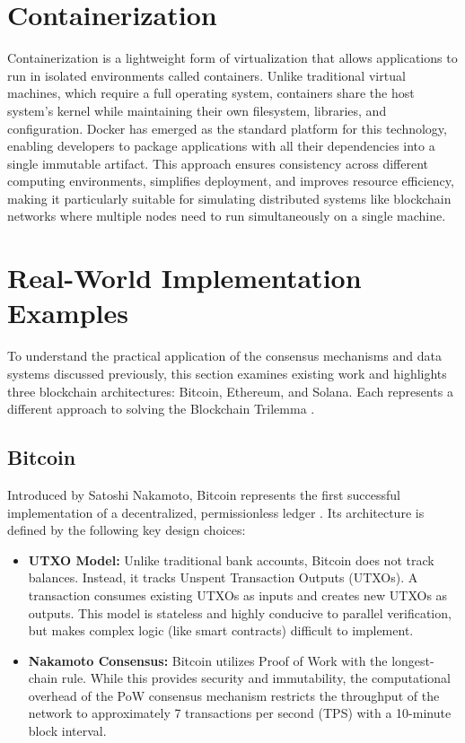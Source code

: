 \section{Containerization} \label{ch2_containerization}

Containerization is a lightweight form of virtualization that allows applications to run in isolated environments called containers. Unlike traditional virtual machines, which require a full operating system, containers share the host system's kernel while maintaining their own filesystem, libraries, and configuration. Docker \cite{docker} has emerged as the standard platform for this technology, enabling developers to package applications with all their dependencies into a single immutable artifact. This approach ensures consistency across different computing environments, simplifies deployment, and improves resource efficiency, making it particularly suitable for simulating distributed systems like blockchain networks where multiple nodes need to run simultaneously on a single machine.


\section{Real-World Implementation Examples} \label{ch2_relatedWork}

To understand the practical application of the consensus mechanisms and data systems discussed previously, this section examines existing work and highlights three blockchain architectures: Bitcoin, Ethereum, and Solana. Each represents a different approach to solving the Blockchain Trilemma \cite{blockchainTrilemma}.

\subsection{Bitcoin}\label{ch2_relatedWork_bitcoin}
Introduced by Satoshi Nakamoto, Bitcoin represents the first successful implementation of a decentralized, permissionless ledger \cite{garay2015bitcoin}. Its architecture is defined by the following key design choices:

\begin{itemize}
    \item \textbf{UTXO Model:} Unlike traditional bank accounts, Bitcoin does not track balances. Instead, it tracks Unspent Transaction Outputs (UTXOs). A transaction consumes existing UTXOs as inputs and creates new UTXOs as outputs. This model is stateless and highly conducive to parallel verification, but makes complex logic (like smart contracts) difficult to implement.
    \item \textbf{Nakamoto Consensus:} Bitcoin utilizes Proof of Work with the longest-chain rule. While this provides security and immutability, the computational overhead of the PoW consensus mechanism restricts the throughput of the network to approximately 7 transactions per second (TPS) with a 10-minute block interval.
\end{itemize}


